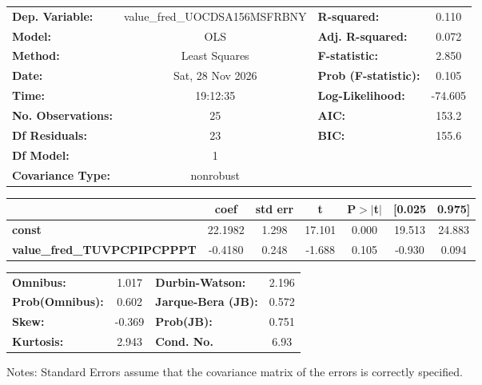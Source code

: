 \begin{center}
\begin{tabular}{lclc}
\toprule
\textbf{Dep. Variable:}             & value\_fred\_UOCDSA156MSFRBNY & \textbf{  R-squared:         } &     0.110   \\
\textbf{Model:}                     &              OLS              & \textbf{  Adj. R-squared:    } &     0.072   \\
\textbf{Method:}                    &         Least Squares         & \textbf{  F-statistic:       } &     2.850   \\
\textbf{Date:}                      &        Sat, 28 Nov 2026       & \textbf{  Prob (F-statistic):} &    0.105    \\
\textbf{Time:}                      &            19:12:35           & \textbf{  Log-Likelihood:    } &   -74.605   \\
\textbf{No. Observations:}          &                 25            & \textbf{  AIC:               } &     153.2   \\
\textbf{Df Residuals:}              &                 23            & \textbf{  BIC:               } &     155.6   \\
\textbf{Df Model:}                  &                  1            & \textbf{                     } &             \\
\textbf{Covariance Type:}           &           nonrobust           & \textbf{                     } &             \\
\bottomrule
\end{tabular}
\begin{tabular}{lcccccc}
                                    & \textbf{coef} & \textbf{std err} & \textbf{t} & \textbf{P$> |$t$|$} & \textbf{[0.025} & \textbf{0.975]}  \\
\midrule
\textbf{const}                      &      22.1982  &        1.298     &    17.101  &         0.000        &       19.513    &       24.883     \\
\textbf{value\_fred\_TUVPCPIPCPPPT} &      -0.4180  &        0.248     &    -1.688  &         0.105        &       -0.930    &        0.094     \\
\bottomrule
\end{tabular}
\begin{tabular}{lclc}
\textbf{Omnibus:}       &  1.017 & \textbf{  Durbin-Watson:     } &    2.196  \\
\textbf{Prob(Omnibus):} &  0.602 & \textbf{  Jarque-Bera (JB):  } &    0.572  \\
\textbf{Skew:}          & -0.369 & \textbf{  Prob(JB):          } &    0.751  \\
\textbf{Kurtosis:}      &  2.943 & \textbf{  Cond. No.          } &     6.93  \\
\bottomrule
\end{tabular}
\end{center}

Notes: \newline
 [1] Standard Errors assume that the covariance matrix of the errors is correctly specified.